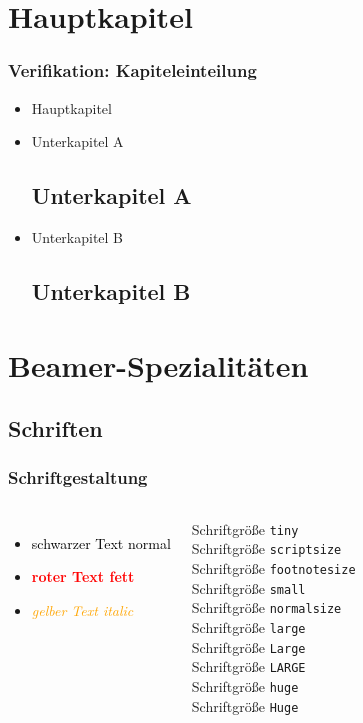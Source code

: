 \documentclass[]{beamer}
\begin{document}
\section{Hauptkapitel}
\begin{frame}
  \frametitle{Verifikation: Kapiteleinteilung}


      \begin{itemize}
        \item Hauptkapitel
        \item Unterkapitel A\subsection{Unterkapitel A}
        \item {\tiny Unterkapitel B\subsection{Unterkapitel B}}
      \end{itemize}

\end{frame}

\section{Beamer-Spezialitäten}
\subsection{Schriften}
\begin{frame}
  \frametitle{Schriftgestaltung}
  \begin{columns}
      \begin{itemize}
        \item \textcolor{black}{schwarzer Text normal}
        \item \textcolor{red}{\textbf{roter Text fett}}
        \item \textcolor{orange}{\textit{gelber Text italic}}
      \end{itemize}
    \tiny Schriftgröße \texttt{tiny}   \\
    \scriptsize Schriftgröße \texttt{scriptsize} \\ 
    \footnotesize Schriftgröße \texttt{footnotesize} \\ 
    \small Schriftgröße \texttt{small} \\ 
    \normalsize Schriftgröße \texttt{normalsize} \\
    \large Schriftgröße \texttt{large} \\
    \Large Schriftgröße \texttt{Large} \\
    \LARGE Schriftgröße \texttt{LARGE} \\ 
    \huge Schriftgröße \texttt{huge} \\ 
    \Huge Schriftgröße \texttt{Huge}
    \end{columns}
\end{frame}
\end{document}
